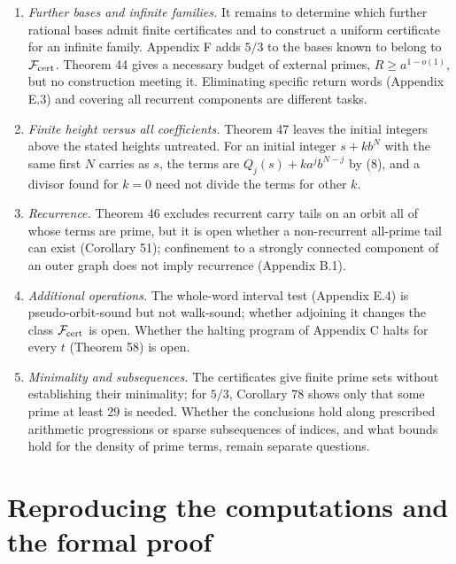 \documentclass[11pt,reqno]{amsart}
\theoremstyle{definition}
\theoremstyle{remark}
\providecommand{\tightlist}{\setlength{\itemsep}{0pt}\setlength{\parskip}{0pt}}
\begin{document}
\begin{enumerate}
\def\labelenumi{\arabic{enumi}.}
\tightlist
\item
  \emph{Further bases and infinite families.} It remains to determine which
  further rational bases admit finite certificates and to construct a
  uniform certificate for an infinite family. Appendix F adds \(5/3\) to
  the bases known to belong to \(\mathcal F_{\rm cert}\). Theorem 44 gives a
  necessary budget of external primes, \(R\ge a^{1-o(1)}\), but no construction meeting it.
  Eliminating specific return words (Appendix E.3) and covering all
  recurrent components are different tasks.
\item
  \emph{Finite height versus all coefficients.} Theorem 47 leaves the
  initial integers above the stated heights untreated. For an initial
  integer \(s+kb^N\) with the same first \(N\) carries as \(s\), the
  terms are \(Q_j(s)+ka^jb^{N-j}\) by (8), and a divisor found for
  \(k=0\) need not divide the terms for other \(k\).
\item
  \emph{Recurrence.} Theorem 46 excludes recurrent carry tails on an
  orbit all of whose terms are prime, but it is open whether a
  non-recurrent all-prime tail can exist (Corollary 51); confinement
  to a strongly connected component of an outer graph does not imply
  recurrence (Appendix B.1).
\item
  \emph{Additional operations.} The whole-word interval test (Appendix E.4)
  is pseudo-orbit-sound but not walk-sound; whether adjoining it changes
  the class \(\mathcal F_{\rm cert}\) is open. Whether the halting
  program of Appendix C halts for every \(t\) (Theorem 58) is open.
\item
  \emph{Minimality and subsequences.} The certificates give finite prime
  sets without establishing their minimality; for \(5/3\),
  Corollary 78 shows only that some prime at least \(29\) is needed. Whether the conclusions
  hold along prescribed arithmetic progressions or sparse subsequences
  of indices, and what bounds hold for the density of prime terms,
  remain separate questions.
\end{enumerate}

\appendix
{}\section{Reproducing the computations and the formal proof}\label{app:A}
\end{document}
